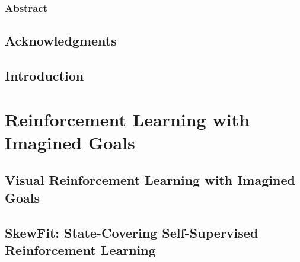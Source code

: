 \documentclass[ titlepage,numbers=noenddot,headinclude,
                footinclude=true,cleardoublepage=empty,abstractoff,
                BCOR=5mm,paper=letter,fontsize=12pt,
                american,
                openany
                ]{scrreprt}
\newcommand\blankpage{%
    \null
    \thispagestyle{empty}%
    \addtocounter{page}{-1}%
    \newpage}
\begin{document}
\frenchspacing
\raggedbottom
{}




\afterpage{\blankpage}

\setcounter{page}{1}
\section*{Abstract}

\newpage

\setcounter{page}{1}%

\begingroup
\let\clearpage\relax
\let\cleardoublepage\relax
\let\cleardoublepage\relax
\chapter*{Acknowledgments}

\endgroup


\pagestyle{firstpage}



\setcounter{page}{1}

\chapter{Introduction}\label{chapter:intro}



 \part{Reinforcement Learning with Imagined Goals}

 \chapter{Visual Reinforcement Learning with Imagined Goals}\label{chapter:rig}
% 

\chapter{SkewFit: State-Covering Self-Supervised Reinforcement Learning}\label{chapter:skewfit}
\end{document}
